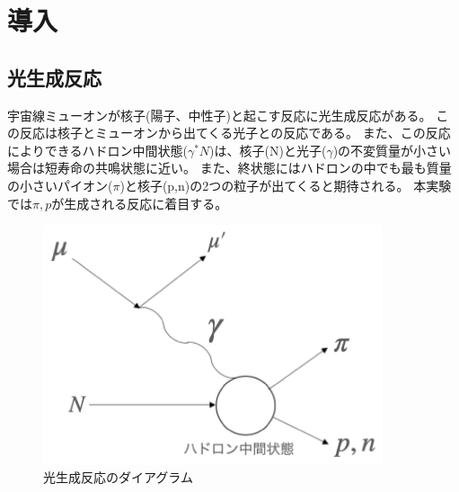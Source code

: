\chapter{導入} \label{cha:introduction}

\section{光生成反応}

宇宙線ミューオンが核子(陽子、中性子)と起こす反応に光生成反応がある。
この反応は核子とミューオンから出てくる光子との反応である。
また、この反応によりできるハドロン中間状態($\gamma ^* N$)は、核子(N)と光子($\gamma$)の不変質量が小さい場合は短寿命の共鳴状態に近い。
また、終状態にはハドロンの中でも最も質量の小さいパイオン($\pi$)と核子(p,n)の2つの粒子が出てくると期待される。
本実験では$\pi,p$が生成される反応に着目する。

\begin{figure}[H]
	\centering
	\includegraphics[width=10cm]{img/diagram_photoproduction.png}
	\caption{光生成反応のダイアグラム}
\end{figure}